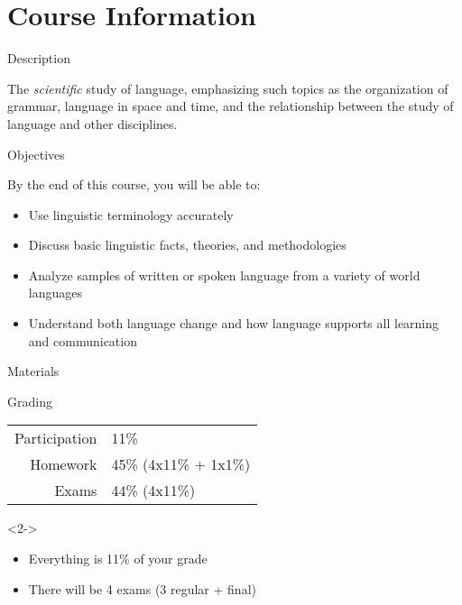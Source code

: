 \documentclass{beamer}
\subtitle[Welcome]{Welcome}
\begin{document}
  

  \section{Course Information}
    \begin{frame}{Description}
      \begin{block}{}
        The \emph{scientific} study of language, emphasizing such topics as the organization of grammar, language in space and time, and the relationship between the study of language and other disciplines.
      \end{block}
    \end{frame}

    \begin{frame}{Objectives}
      \begin{block}{}
        By the end of this course, you will be able to:
        \begin{itemize}
          \item Use linguistic terminology accurately
          \item Discuss basic linguistic facts, theories, and methodologies
          \item Analyze samples of written or spoken language from a variety of world languages
          \item Understand both language change and how language supports all learning and communication
        \end{itemize}
      \end{block}
    \end{frame}

    \begin{frame}{Materials}
      \begin{block}{}
      \end{block}
    \end{frame}

    \begin{frame}{Grading}
      \begin{block}{}
        \begin{tabular}{r l}
          Participation & 11\%\\
          Homework      & 45\% (4x11\% + 1x1\%)\\
          Exams         & 44\% (4x11\%)
        \end{tabular}
      \end{block}

      \begin{alertblock}<2->{}
        \begin{itemize}
          \item Everything is 11\% of your grade
          \item There will be 4 exams (3 regular + final)
        \end{itemize}
      \end{alertblock}
    \end{frame}
\end{document}
